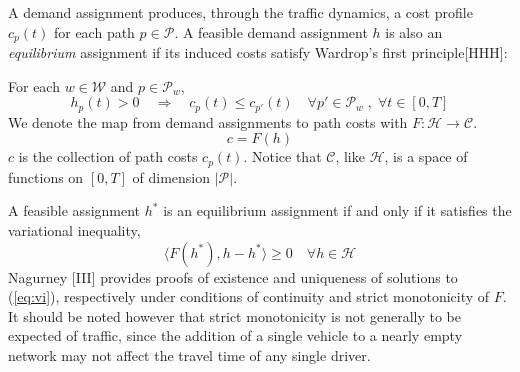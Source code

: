 A demand assignment produces, through the traffic dynamics, a cost profile $c_p(t)$ for each path $p\in\mathcal{P}$. 
A feasible demand assignment $h$ is also an \textit{equilibrium} assignment if its induced costs satisfy Wardrop's first principle[HHH]: 

\noindent For each $w\in\mathcal{W}$ and $p\in \mathcal{P}_w$,
\begin{equation}
h_p(t) > 0 \quad
 \Rightarrow \quad c_p(t) \leq c_{p'}(t) \quad \forall p'\in\mathcal{P}_w \;,\; 
 \forall t\in[0,T]
\end{equation}
We denote the map from demand assignments to path costs with $F : \mathcal{H}\rightarrow \mathcal{C}$. 
\begin{equation}
c = F(h)
\end{equation}
$c$ is the collection of path costs $c_p(t)$. Notice that $\mathcal{C}$, like $\mathcal{H}$, is a space of functions on $[0,T]$ of dimension $|\mathcal{P}|$. 


A feasible assignment $h^*$ is an equilibrium assignment if and only if \XXX it satisfies the variational inequality,
\begin{equation}
\label{eq:vi}
\langle F(h^*), h-h^* \rangle \geq 0 \quad \forall h\in\mathcal{H}
\end{equation}
Nagurney [III] provides proofs of existence and uniqueness of solutions to (\ref{eq:vi}), respectively under conditions of continuity and strict monotonicity of $F$. It should be noted however that strict monotonicity is not generally to be expected of traffic, since the addition of a single vehicle to a nearly empty network may not affect the travel time of any single driver.

